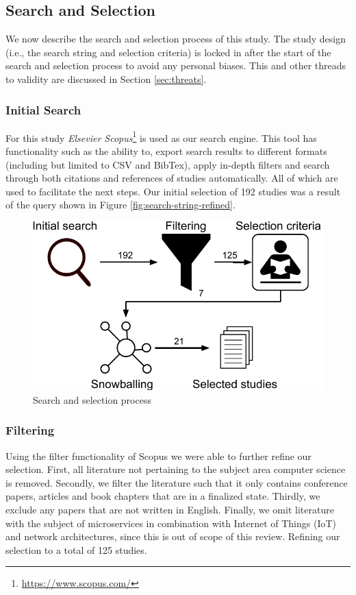 \subsection{Search and Selection}
We now describe the search and selection process of this study. The study design (i.e., the search string and selection criteria) is locked in after the start of the search and selection process to avoid any personal biases. This and other threads to validity are discussed in Section \ref{sec:threats}.

\subsubsection{Initial Search}
For this study \textit{Elsevier Scopus}\footnote{\url{https://www.scopus.com/}} is used as our search engine. This tool has functionality such as the ability to, export search results to different formats (including but limited to CSV and BibTex), apply in-depth filters and search through both citations and references of studies automatically. All of which are used to facilitate the next steps. Our initial selection of 192 studies was a result of the query shown in Figure \ref{fig:search-string-refined}.


\begin{figure}
    \includegraphics[scale=0.42]{images/search-and-selection.pdf}
    \caption{Search and selection process}
    \label{fig:search-and-selection}
\end{figure}

\subsubsection{Filtering}
Using the filter functionality of Scopus we were able to further refine our selection. First, all literature not pertaining to the subject area computer science is removed. Secondly, we filter the literature such that it only contains conference papers, articles and book chapters that are in a finalized state. Thirdly, we exclude any papers that are not written in English. Finally, we omit literature with the subject of microservices in combination with Internet of Things (IoT) and network architectures, since this is out of scope of this review. Refining our selection to a total of 125 studies.


